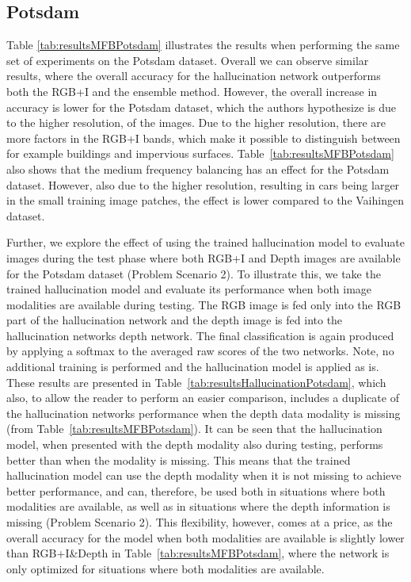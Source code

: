 \documentclass[journal]{IEEEtran}
\begin{document}
\subsection{Potsdam}
\label{sec:potsdam}
Table \ref{tab:resultsMFBPotsdam} illustrates the results when performing the same set of experiments on the Potsdam dataset. Overall we can observe similar results, where the overall accuracy for the hallucination network outperforms both the RGB+I and the ensemble method. However, the overall increase in accuracy is lower for the Potsdam dataset, which the authors hypothesize is due to the higher resolution, of the images. Due to the higher resolution, there are more factors in the RGB+I bands, which make it possible to distinguish between for example buildings and impervious surfaces.
Table~\ref{tab:resultsMFBPotsdam} also shows that the medium frequency balancing has an effect for the Potsdam dataset. However, also due to the higher resolution, resulting in cars being larger in the small training image patches, the effect is lower compared to the Vaihingen dataset.

Further, we explore the effect of using the trained hallucination model to evaluate images during the test phase where both RGB+I and Depth images are available for the Potsdam dataset (Problem Scenario 2). To illustrate this, we take the trained hallucination model and evaluate its performance when both image modalities are available during testing. The RGB image is fed only into the RGB part of the hallucination network and the depth image is fed into the hallucination networks depth network. The final classification is again produced by applying a softmax to the averaged raw scores of the two networks.
Note, no additional training is performed and the hallucination model is applied as is.
These results are presented in Table~\ref{tab:resultsHallucinationPotsdam}, which also, to allow the reader to perform an easier comparison, includes a duplicate of the hallucination networks performance when the depth data modality is missing (from Table~\ref{tab:resultsMFBPotsdam}). It can be seen that the hallucination model, when presented with the depth modality also during testing, performs better than when the modality is missing. This means that the trained hallucination model can use the depth modality when it is not missing to achieve better performance, and can, therefore, be used both in situations where both modalities are available, as well as in situations where the depth information is missing (Problem Scenario 2). This flexibility, however, comes at a price, as the overall accuracy for the model when both modalities are available is slightly lower than RGB+I\&Depth in Table~\ref{tab:resultsMFBPotsdam}, where the network is only optimized for situations where both modalities are available.
\end{document}
